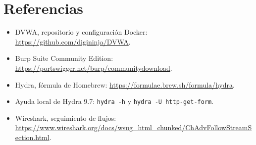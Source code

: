 \documentclass[letterpaper,12pt]{article}
\begin{document}
\section*{Referencias}
\begin{itemize}
\item DVWA, repositorio y configuración Docker: \url{https://github.com/digininja/DVWA}.
\item Burp Suite Community Edition: \url{https://portswigger.net/burp/communitydownload}.
\item Hydra, fórmula de Homebrew: \url{https://formulae.brew.sh/formula/hydra}.
\item Ayuda local de Hydra 9.7: \texttt{hydra -h} y \texttt{hydra -U http-get-form}.
\item Wireshark, seguimiento de flujos: \url{https://www.wireshark.org/docs/wsug_html_chunked/ChAdvFollowStreamSection.html}.
\end{itemize}
\end{document}
